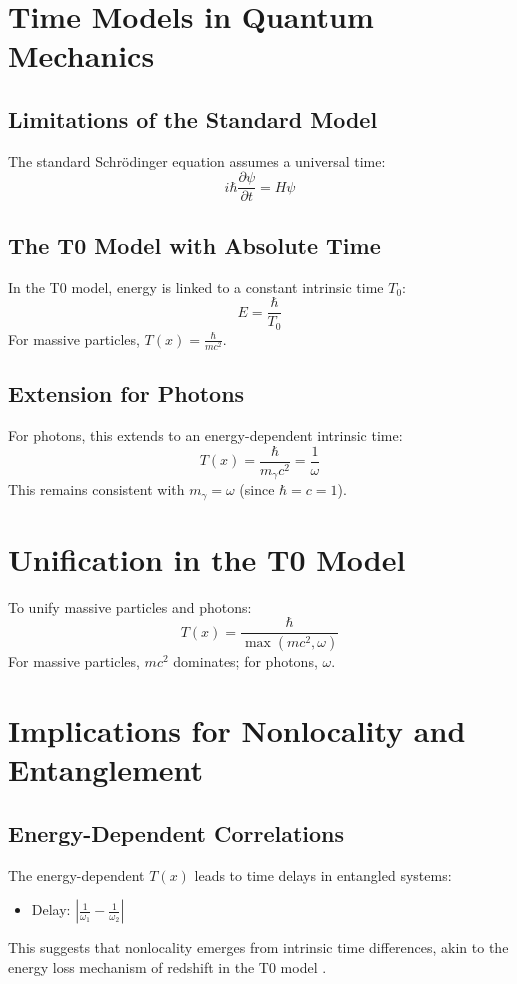 \documentclass[12pt,a4paper]{article}
\newcommand{\Tfield}{T(x)}
\begin{document}
	\section{Time Models in Quantum Mechanics}
	\subsection{Limitations of the Standard Model}
	The standard Schrödinger equation assumes a universal time:
	\begin{equation}
		i\hbar\frac{\partial\psi}{\partial t} = H\psi
	\end{equation}
	
	\subsection{The T0 Model with Absolute Time}
	In the T0 model, energy is linked to a constant intrinsic time \(T_0\):
	\begin{equation}
		E = \frac{\hbar}{T_0}
	\end{equation}
	For massive particles, \(\Tfield = \frac{\hbar}{m c^2}\).
	
	\subsection{Extension for Photons}
	For photons, this extends to an energy-dependent intrinsic time:
	\begin{equation}
		\Tfield = \frac{\hbar}{m_\gamma c^2} = \frac{1}{\omega}
	\end{equation}
	This remains consistent with \(m_\gamma = \omega\) (since \(\hbar = c = 1\)).
	
	\section{Unification in the T0 Model}
	To unify massive particles and photons:
	\begin{equation}
		\Tfield = \frac{\hbar}{\max(m c^2, \omega)}
	\end{equation}
	For massive particles, \(m c^2\) dominates; for photons, \(\omega\).
	
	\section{Implications for Nonlocality and Entanglement}
	\subsection{Energy-Dependent Correlations}
	The energy-dependent \(\Tfield\) leads to time delays in entangled systems:
	\begin{itemize}
		\item Delay: \(\left|\frac{1}{\omega_1} - \frac{1}{\omega_2}\right|\)
	\end{itemize}
	This suggests that nonlocality emerges from intrinsic time differences, akin to the energy loss mechanism of redshift in the T0 model \cite{pascher_messdifferenzen_2025}.
	
\end{document}
